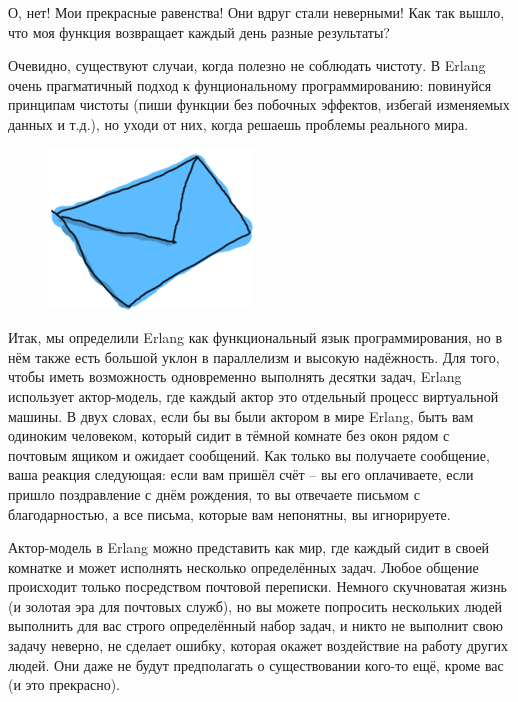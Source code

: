 \documentclass[a4paper,12pt]{report}
\begin{document}
О, нет! Мои прекрасные равенства! Они вдруг стали неверными! Как так вышло, что моя функция возвращает каждый день разные результаты?

Очевидно, существуют случаи, когда полезно не соблюдать чистоту. В Erlang очень прагматичный подход к фунциональному программированию: повинуйся принципам чистоты (пиши функции без побочных эффектов, избегай изменяемых данных и т.д.), но уходи от них, когда решаешь проблемы реального мира.

\begin{figure}
    \includegraphics[width=1\linewidth]{envelope.png}
\end{figure}
Итак, мы определили Erlang как функциональный язык программирования, но в нём также есть большой уклон в параллелизм и высокую надёжность. Для того, чтобы иметь возможность одновременно выполнять десятки задач, Erlang использует актор\--модель, где каждый актор это отдельный процесс виртуальной машины. В двух словах, если бы вы были актором в мире Erlang, быть вам одиноким человеком, который сидит в тёмной комнате без окон рядом с почтовым ящиком и ожидает сообщений. Как только вы получаете сообщение, ваша реакция следующая: если вам пришёл счёт \--- вы его оплачиваете, если пришло поздравление с днём рождения, то вы отвечаете письмом с благодарностью, а все письма, которые вам непонятны, вы игнорируете.

Актор\--модель в Erlang можно представить как мир, где каждый сидит в своей комнатке и может исполнять несколько определённых задач. Любое общение происходит только посредством почтовой переписки. Немного скучноватая жизнь (и золотая эра для почтовых служб), но вы можете попросить нескольких людей выполнить для вас строго определённый набор задач, и никто не выполнит свою задачу неверно, не сделает ошибку, которая окажет воздействие на работу других людей. Они даже не будут предполагать о существовании кого\--то ещё, кроме вас (и это прекрасно).
\end{document}
